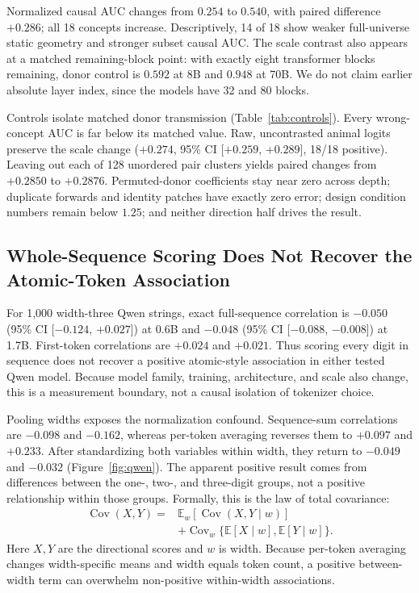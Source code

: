 \documentclass[letterpaper]{article}
\newcommand{\CI}[2]{95\% CI [#1, #2]}
\begin{document}
Normalized causal AUC changes from $0.254$ to $0.540$, with paired difference
$+0.286$; all 18 concepts increase. Descriptively, 14 of 18 show weaker
full-universe static geometry and stronger subset causal AUC. The scale contrast also appears at a
matched remaining-block point: with exactly eight transformer blocks remaining,
donor control is $0.592$ at 8B and $0.948$ at 70B. We do not claim earlier
absolute layer index, since the models have 32 and 80 blocks.

Controls isolate matched donor transmission (Table~\ref{tab:controls}). Every
wrong-concept AUC is far below its matched value. Raw, uncontrasted animal
logits preserve the scale change ($+0.274$, \CI{$+0.259$}{$+0.289$}, 18/18
positive). Leaving out each of
128 unordered pair clusters yields paired changes from $+0.2850$ to $+0.2876$.
Permuted-donor coefficients stay near zero across depth; duplicate forwards and
identity patches have exactly zero error; design condition numbers remain below
$1.25$; and neither direction half drives the result.

\subsection{Whole-Sequence Scoring Does Not Recover the Atomic-Token Association}

For 1,000 width-three Qwen strings, exact full-sequence correlation is $-0.050$
(\CI{$-0.124$}{$+0.027$}) at 0.6B and $-0.048$
(\CI{$-0.088$}{$-0.008$}) at 1.7B. First-token correlations are $+0.024$ and
$+0.021$. Thus scoring every digit in sequence does not recover a positive
atomic-style association in either tested Qwen model. Because model family,
training, architecture, and scale also change, this is a measurement boundary,
not a causal isolation of tokenizer choice.

Pooling widths exposes the normalization confound. Sequence-sum correlations are
$-0.098$ and $-0.162$, whereas per-token averaging reverses them to $+0.097$
and $+0.233$. After standardizing both variables within width, they return to
$-0.049$ and $-0.032$ (Figure~\ref{fig:qwen}). The apparent positive result
comes from differences between the one-, two-, and three-digit groups, not a
positive relationship within those groups. Formally, this is the law of total
covariance:
\begin{align}
\operatorname{Cov}(X,Y)={}&\mathbb{E}_w[\operatorname{Cov}(X,Y\mid w)]\nonumber\\
&+\operatorname{Cov}_w\{\mathbb{E}[X\mid w],\mathbb{E}[Y\mid w]\}.
\end{align}
Here $X,Y$ are the directional scores and $w$ is width. Because per-token
averaging changes width-specific means and width equals token count, a positive
between-width term can overwhelm non-positive within-width associations.
\end{document}
